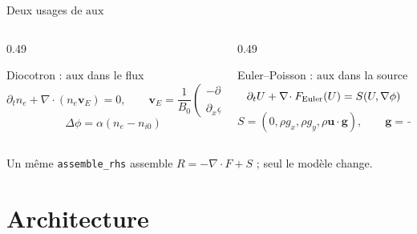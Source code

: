 \documentclass[10pt,aspectratio=169]{beamer}
\newcommand{\code}[1]{\texttt{\footnotesize #1}}
\begin{document}
\begin{frame}{Deux usages de \(\mathrm{aux}\)}
  \begin{columns}[T,onlytextwidth]
    \begin{column}{0.49\textwidth}
      \begin{block}{Diocotron : \(\mathrm{aux}\) dans le flux}
        \[
          \partial_t n_e+\nabla\!\cdot(n_e \mathbf{v}_E)=0,
          \qquad
          \mathbf{v}_E=\frac{1}{B_0}
          \begin{pmatrix}
            -\partial_y\phi\\
             \partial_x\phi
          \end{pmatrix}
        \]
        \[
          \Delta\phi=\alpha(n_e-n_{i0})
        \]
      \end{block}
    \end{column}
    \begin{column}{0.49\textwidth}
      \begin{block}{Euler--Poisson : \(\mathrm{aux}\) dans la source}
        \[
          \partial_t U+\nabla\!\cdot F_{\rm Euler}(U)=S(U,\nabla\phi)
        \]
        \[
          S=(0,\rho g_x,\rho g_y,\rho\mathbf{u}\!\cdot\!\mathbf{g}),
          \qquad
          \mathbf{g}=-\nabla\phi
        \]
      \end{block}
    \end{column}
  \end{columns}

  \vspace{0.25cm}
  Un même \code{assemble\_rhs} assemble \(R=-\nabla\cdot F+S\) ; seul le modèle change.
\end{frame}

\section{Architecture}
\end{document}
